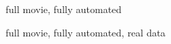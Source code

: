 \begin{figure}[H]
\caption{full movie, fully automated} \label{fig:spatial_full}
\end{figure}

\begin{figure}[H]
\caption{full movie, fully automated, real data} \label{fig:spatial_full_data}
\end{figure}


